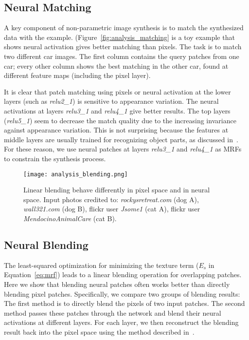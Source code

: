 \documentclass[10pt,twocolumn,letterpaper]{article}
\begin{document}
\subsection{Neural Matching}
A key component of non-parametric image synthesis is to match the synthesized data with the example. (Figure~\ref{fig:analysis_matching} is a toy example that shows neural activation gives better matching than pixels. The task is to match two different car images. The first column contains the query patches from one car; every other column shows the best matching in the other car, found at different feature maps (including the pixel layer).

It is clear that patch matching using pixels or neural activation at the lower layers (such as \textit{relu2\_1}) is sensitive to appearance variation. The neural activations at layers \textit{relu3\_1} and \textit{relu4\_1} give better results. The top layers (\textit{relu5\_1}) seem to decrease the match quality due to the increasing invariance against appearance variation. This is not surprising because the features at middle layers are usually trained for recognizing object parts, as discussed in~\cite{Zeiler14}. For these reason, we use neural patches at layers \textit{relu3\_1} and \textit{relu4\_1} as MRFs to constrain the synthesis process.

\begin{figure}[t]
	\centering
	\texttt{[image: analysis\_blending.png]}
	\caption{Linear blending behave differently in pixel space and in neural space. Input photos credited to: \emph{rockysretreat.com} (dog A), \emph{wall321.com} (dog B), flickr user \emph{Jsome1} (cat A), flickr user \emph{MendocinoAnimalCare} (cat B).}\label{fig:analysis_blending}
\end{figure}

\subsection{Neural Blending}
The least-squared optimization for minimizing the texture term ($E_{s}$ in Equation~\ref{eq:mrf}) leads to a linear blending operation for overlapping patches. Here we show that blending neural patches often works better than directly blending pixel patches. Specifically, we compare two groups of blending results: The first method is to directly blend the pixels of two input patches. The second method passes these patches through the network and blend their neural activations at different layers. For each layer, we then reconstruct the blending result back into the pixel space using the method described in~\cite{Mahendran15}.
\end{document}
